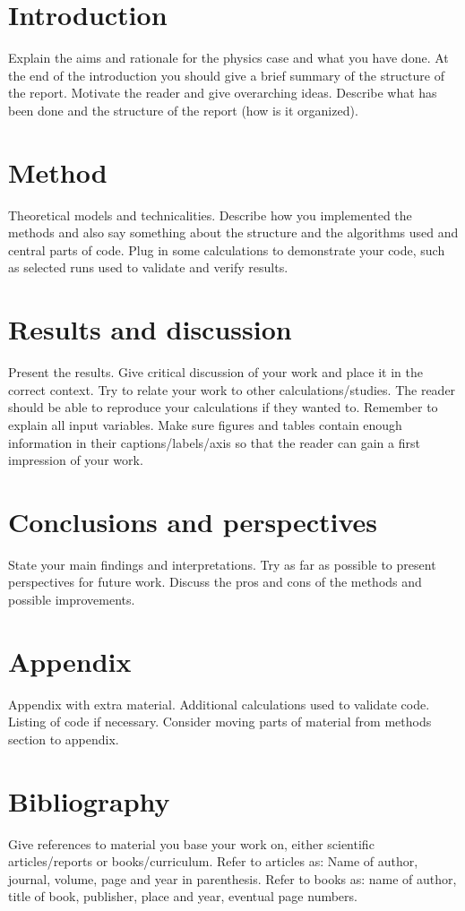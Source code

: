 \documentclass[norsk, a4paper]{report}
\begin{document}


\section{Introduction}
Explain the aims and rationale for the physics case and what you have done. At the end of the introduction you should give a brief summary of the structure of the report. Motivate the reader and give overarching ideas. Describe what has been done and the structure of the report (how is it organized).


\section{Method}
Theoretical models and technicalities. Describe how you implemented the methods and also say something about the structure and the algorithms used and central parts of code. Plug in some calculations to demonstrate your code, such as selected runs used to validate and verify results.


\section{Results and discussion}
Present the results. Give critical discussion of your work and place it in the correct context. Try to relate your work to other calculations/studies. The reader should be able to reproduce your calculations if they wanted to. Remember to explain all input variables. Make sure figures and tables contain enough information in their captions/labels/axis so that the reader can gain a first impression of your work.


\section{Conclusions and perspectives}
State your main findings and interpretations. Try as far as possible to present perspectives for future work. Discuss the pros and cons of the methods and possible improvements.


\section{Appendix}
Appendix with extra material. Additional calculations used to validate code. Listing of code if necessary. Consider moving parts of material from methods section to appendix.


\section{Bibliography}
Give references to material you base your work on, either scientific articles/reports or books/curriculum. Refer to articles as: Name of author, journal, volume, page and year in parenthesis. Refer to books as: name of author, title of book, publisher, place and year, eventual page numbers.
\end{document}
